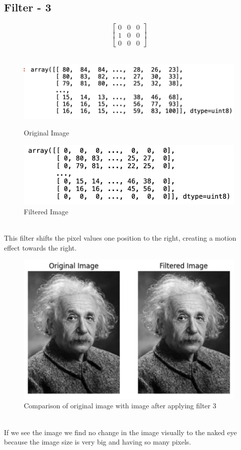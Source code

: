 \documentclass{assignment}
\begin{document}
\subsection{Filter - 3}

\[
\begin{bmatrix} 0 & 0 & 0 \\ 1 & 0 & 0 \\ 0 & 0 & 0 \end{bmatrix}
\]
\\
\begin{figure}[h]
  \begin{minipage}{0.5\textwidth}
    \centering
    \includegraphics[width=0.8\linewidth]{image.png}
    \caption{Original Image}
    \label{fig:original_image}
  \end{minipage}%
  \begin{minipage}{0.5\textwidth}
    \centering
    \includegraphics[width=0.8\linewidth]{f3.png}
    \caption{Filtered Image}
    \label{fig:filtered_image}
  \end{minipage}
\end{figure}
\\

This filter shifts the pixel values one position to the right, creating a motion effect towards the right.
\begin{figure}[h]
    \centering
    \includegraphics[width=0.4\linewidth]{magic.png}
    \caption{Comparison of original image with image after applying filter 3}
    \label{fig:enter-label}
\end{figure}
\\
If we see the image we  find no change in the image visually to the naked eye because the image size is very big and having so many pixels.
\newpage
\end{document}
